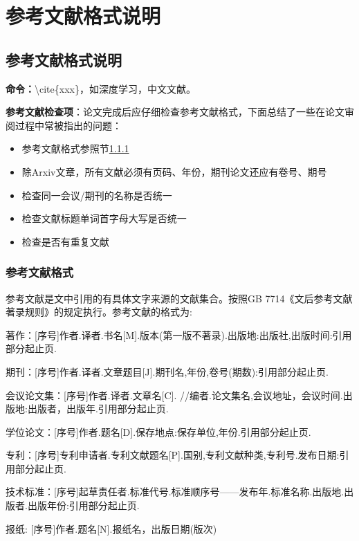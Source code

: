 \chapter{参考文献格式说明}
\label{cha:chap3}


\section{参考文献格式说明}

\textbf{命令：}\textbackslash cite\{xxx\}，如深度学习\cite{lecunDeepLearning2015}，中文文献\cite{zhou2021}。


\textbf{参考文献检查项}：论文完成后应仔细检查参考文献格式，下面总结了一些在论文审阅过程中常被指出的问题：

\begin{itemize}
	\item 参考文献格式参照节\ref{subsec:ref}
	\item 除Arxiv文章，所有文献必须有页码、年份，期刊论文还应有卷号、期号
	\item 检查同一会议/期刊的名称是否统一
	\item 检查文献标题单词首字母大写是否统一
	\item 检查是否有重复文献
\end{itemize}








\subsection{参考文献格式}\label{subsec:ref}

参考文献是文中引用的有具体文字来源的文献集合。按照GB 7714《文后参考文献著录规则》的规定执行。参考文献的格式为:

著作：[序号]作者.译者.书名[M].版本(第一版不著录).出版地:出版社,出版时间:引用部分起止页.

期刊：[序号]作者.译者.文章题目[J].期刊名,年份,卷号(期数):引用部分起止页.

会议论文集：[序号]作者.译者.文章名[C]. //编者.论文集名,会议地址，会议时间.出版地:出版者，出版年.引用部分起止页.

学位论文：[序号]作者.题名[D].保存地点:保存单位,年份.引用部分起止页.

专利：[序号]专利申请者.专利文献题名[P].国别,专利文献种类,专利号.发布日期:引用部分起止页.

技术标准：[序号]起草责任者.标准代号.标准顺序号——发布年.标准名称.出版地.出版者.出版年份:引用部分起止页.

报纸: [序号]作者.题名[N].报纸名，出版日期(版次)


